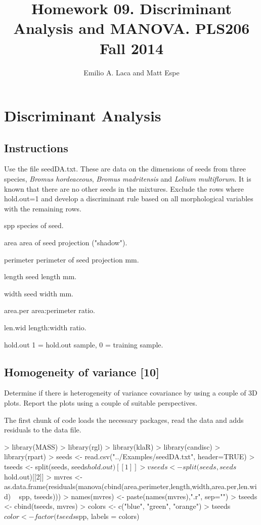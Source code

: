 \documentclass{article}
\begin{document}


\title{Homework 09. Discriminant Analysis and MANOVA. PLS206 Fall 2014}
\author{Emilio A. Laca and Matt Espe}
\maketitle


\section {Discriminant Analysis}
\subsection{Instructions}
Use the file seedDA.txt. These are data on the dimensions of seeds from three species, \emph{Bromus hordeaceous}, \emph{Bromus madritensis} and \emph{Lolium multiflorum}. It is known that there are no other seeds in the mixtures. Exclude the rows where hold.out=1 and develop a discriminant rule based on all morphological variables with the remaining rows.

\begin{description*}
  \item[spp] species of seed.
  \item[area] area of seed projection ("shadow").
  \item[perimeter] perimeter of seed projection mm.
  \item[length] seed length mm.
  \item[width] seed width mm.
  \item[area.per] area:perimeter ratio.
  \item[len.wid] length:width ratio.
  \item[hold.out] 1 = hold.out sample, 0 = training sample.
\end{description*}


\subsection{Homogeneity of variance [10]}
Determine if there is heterogeneity of variance covariance by using a couple of 3D plots. Report the plots using a couple of suitable perspectives.

The first chunk of code loads the necessary packages, read the data and adds residuals to the data file.
\begin{Schunk}
\begin{Sinput}
> library(MASS)
> library(rgl)
> library(klaR)
> library(candisc)
> library(rpart)
> seeds <- read.csv("../Examples/seedDA.txt", header=TRUE)
> tseeds <- split(seeds, seeds$hold.out)[[1]]
> vseeds <- split(seeds, seeds$hold.out)[[2]]
> mvres <- as.data.frame(residuals(manova(cbind(area,perimeter,length,width,area.per,len.wid) ~ spp, tseeds)))
> names(mvres) <- paste(names(mvres),".r", sep="")
> tseeds <- cbind(tseeds, mvres)
> colors <- c("blue", "green", "orange")
> tseeds$color <- factor(tseeds$spp, labels = colors)
\end{Sinput}
\end{Schunk}
\end{document}
